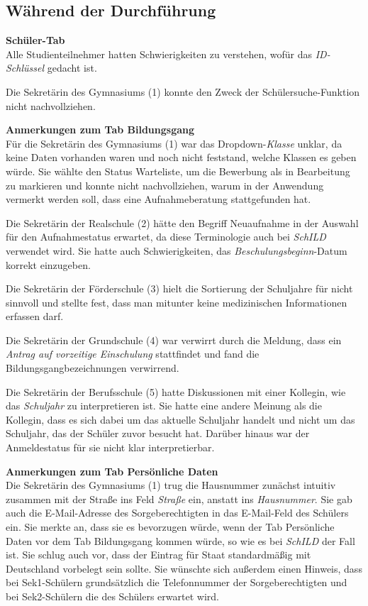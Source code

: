 \subsection{Während der Durchführung}

\textbf{\glqq Schüler\grqq{}-Tab}\\
Alle Studienteilnehmer hatten Schwierigkeiten zu verstehen, wofür das \textit{ID-Schlüssel} gedacht ist.

Die Sekretärin des Gymnasiums (1) konnte den Zweck der Schülersuche-Funktion nicht nachvollziehen.


\textbf{Anmerkungen zum Tab \glqq Bildungsgang\grqq{}}\\
Für die Sekretärin des Gymnasiums (1) war das Dropdown-\textit{Klasse} unklar, da keine Daten vorhanden waren und noch nicht feststand, welche Klassen es geben würde. Sie wählte den Status \glqq Warteliste\grqq{}, um die Bewerbung als \glqq in Bearbeitung\grqq{} zu markieren und konnte nicht nachvollziehen, warum in der Anwendung vermerkt werden soll, dass eine Aufnahmeberatung stattgefunden hat.

Die Sekretärin der Realschule (2) hätte den Begriff \glqq Neuaufnahme\grqq{} in der Auswahl für den Aufnahmestatus erwartet, da diese Terminologie auch bei \textit{SchILD} verwendet wird. Sie hatte auch Schwierigkeiten, das \textit{Beschulungsbeginn}-Datum korrekt einzugeben.

Die Sekretärin der Förderschule (3) hielt die Sortierung der Schuljahre für nicht sinnvoll und stellte fest, dass man mitunter keine medizinischen Informationen erfassen darf.

Die Sekretärin der Grundschule (4) war verwirrt durch die Meldung, dass ein \textit{Antrag auf vorzeitige Einschulung} stattfindet und fand die Bildungsgangbezeichnungen verwirrend.

Die Sekretärin der Berufsschule (5) hatte Diskussionen mit einer Kollegin, wie das \textit{Schuljahr} zu interpretieren ist. Sie hatte eine andere Meinung als die Kollegin, dass es sich dabei um das aktuelle Schuljahr handelt und nicht um das Schuljahr, das der Schüler zuvor besucht hat. Darüber hinaus war der Anmeldestatus für sie nicht klar interpretierbar.

\textbf{Anmerkungen zum Tab \glqq Persönliche Daten\grqq{}}\\
Die Sekretärin des Gymnasiums (1) trug die Hausnummer zunächst intuitiv zusammen mit der Straße ins Feld \textit{Straße} ein, anstatt ins \textit{Hausnummer}. Sie gab auch die E-Mail-Adresse des Sorgeberechtigten in das E-Mail-Feld des Schülers ein. Sie merkte an, dass sie es bevorzugen würde, wenn der Tab \glqq Persönliche Daten\grqq{} vor dem Tab \glqq Bildungsgang\grqq{} kommen würde, so wie es bei \glqq  \textit{SchILD} \grqq{} der Fall ist. Sie schlug auch vor, dass der Eintrag für \glqq Staat\grqq{} standardmäßig mit \glqq Deutschland\grqq{} vorbelegt sein sollte. Sie wünschte sich außerdem einen Hinweis, dass bei Sek1-Schülern grundsätzlich die Telefonnummer der Sorgeberechtigten und bei Sek2-Schülern die des Schülers erwartet wird.


